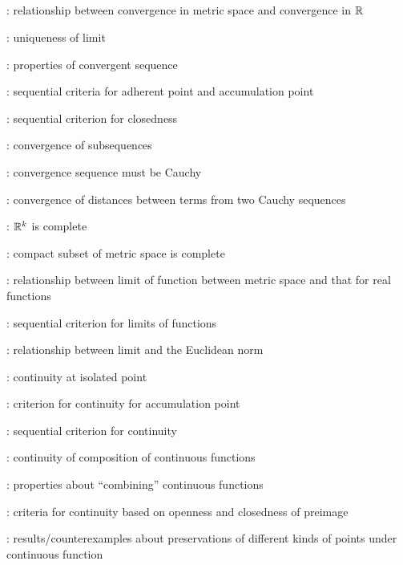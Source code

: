 \subsection*{}
\item {}: relationship between convergence in metric space and convergence in \(\mathbb{R}\)
\item {}: uniqueness of limit
\item {}: properties of convergent sequence
\item {}: sequential criteria for adherent point and accumulation point
\item {}: sequential criterion for closedness
\item {}: convergence of subsequences
\item {}: convergence sequence must be Cauchy
\item {}: convergence of distances between terms from two Cauchy sequences
\item {}: \(\mathbb{R}^k\) is complete
\item {}: compact subset of metric space is complete
\item {}: relationship between limit of function between metric space and that for real functions
\item {}: sequential criterion for limits of functions
\item {}: relationship between limit and the Euclidean norm
\item {}: continuity at isolated point
\item {}: criterion for continuity for accumulation point
\item {}: sequential criterion for continuity
\item {}: continuity of composition of continuous functions
\item {}: properties about ``combining'' continuous functions
\item {}: criteria for continuity based on openness and closedness of preimage
\item {}: results/counterexamples about preservations of different kinds of points under continuous function

